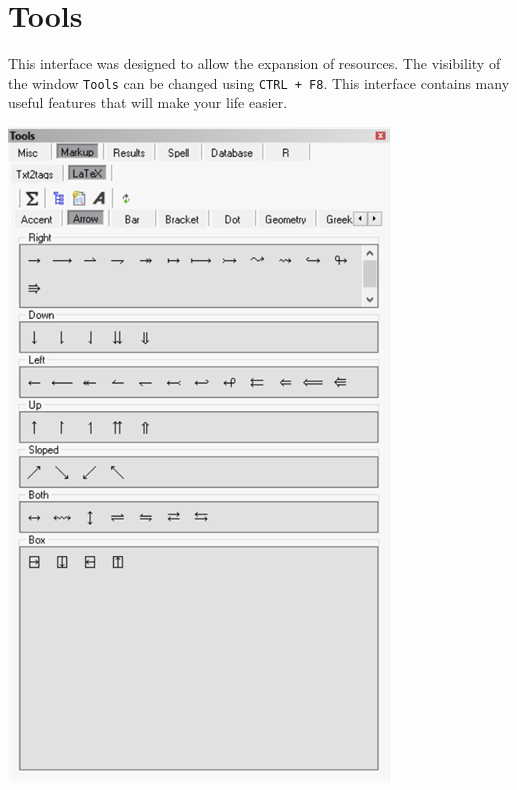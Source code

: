 
\section{Tools}

This interface was designed to allow the expansion of resources.
The visibility of the window \texttt{Tools} can be changed using \texttt{CTRL + F8}.
This interface contains many useful features that will make your life easier.

\includegraphics[scale=0.50]{./res/tools_markup_latex_arrows.png}
